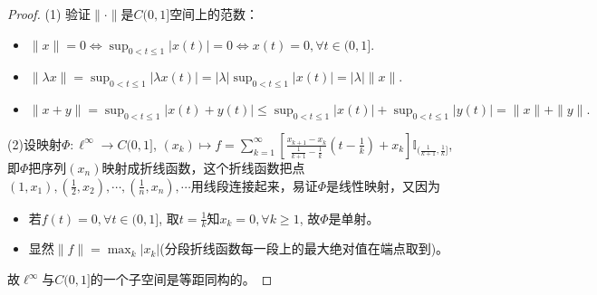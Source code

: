 \documentclass[a4paper,8pt]{ctexart}\textwidth 140mm \textheight 216mm
\newcommand{\8}{\infty}
\begin{document}
\begin{proof}
	(1) 验证$\|\cdot\|$是$C(0,1]$空间上的范数：
	\begin{itemize}
		\item $\|x\|=0\Leftrightarrow \sup_{0<t\leq 1}|x(t)|=0\Leftrightarrow x(t)=0,\forall t\in(0,1]$.
		\item $\|\lambda x\|=\sup_{0<t\leq 1}|\lambda x(t)|=|\lambda|\sup_{0<t\leq 1}|x(t)|=|\lambda|\|x\|$.
		\item $\|x+y\|=\sup_{0<t\leq 1}|x(t)+y(t)|\leq \sup_{0<t\leq 1}|x(t)|+\sup_{0<t\leq 1}|y(t)|=\|x\|+\|y\|.$
	\end{itemize}

    (2)设映射$\Phi:\ell^\infty\rightarrow C(0,1]$, $(x_k)\mapsto f=\sum_{k=1}^\infty\left[\frac{x_{k+1}-x_k}{\frac{1}{k+1}-\frac{1}{k}}(t-\frac{1}{k})+x_k\right]\mathbb{I}_{(\frac{1}{k+1},\frac{1}{k}]}$, 即$\Phi$把序列$(x_n)$映射成折线函数，这个折线函数把点$(1,x_1),(\frac{1}{2},x_2),\cdots,(\frac{1}{n},x_n),\cdots$用线段连接起来，易证$\Phi$是线性映射，又因为
    \begin{itemize}
    	\item 若$f(t)=0,\forall t\in(0,1]$, 取$t=\frac{1}{k}$知$x_k=0,\forall k\geq 1$, 故$\Phi$是单射。
    	\item 显然$\|f\|=\max_k |x_k|$(分段折线函数每一段上的最大绝对值在端点取到)。
    \end{itemize} 
    故$\ell^\infty$与$C(0,1]$的一个子空间是等距同构的。
\end{proof}
\end{document}
